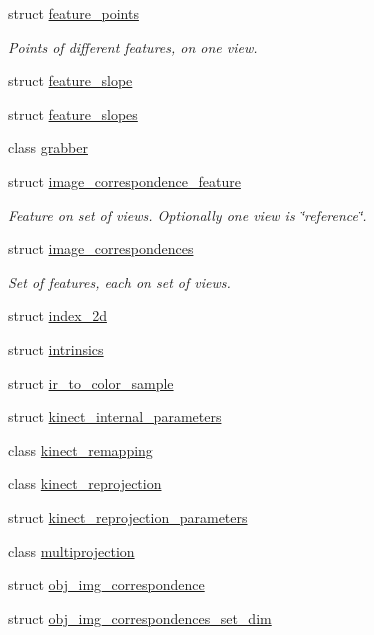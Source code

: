 \begin{DoxyCompactItemize}
struct \hyperlink{structtlz_1_1feature__points}{feature\+\_\+points}
\begin{DoxyCompactList}\small\item\em Points of different features, on one view. \end{DoxyCompactList}\item 
struct \hyperlink{structtlz_1_1feature__slope}{feature\+\_\+slope}
\item 
struct \hyperlink{structtlz_1_1feature__slopes}{feature\+\_\+slopes}
\item 
class \hyperlink{classtlz_1_1grabber}{grabber}
\item 
struct \hyperlink{structtlz_1_1image__correspondence__feature}{image\+\_\+correspondence\+\_\+feature}
\begin{DoxyCompactList}\small\item\em Feature on set of views. Optionally one view is \char`\"{}reference\char`\"{}. \end{DoxyCompactList}\item 
struct \hyperlink{structtlz_1_1image__correspondences}{image\+\_\+correspondences}
\begin{DoxyCompactList}\small\item\em Set of features, each on set of views. \end{DoxyCompactList}\item 
struct \hyperlink{structtlz_1_1index__2d}{index\+\_\+2d}
\item 
struct \hyperlink{structtlz_1_1intrinsics}{intrinsics}
\item 
struct \hyperlink{structtlz_1_1ir__to__color__sample}{ir\+\_\+to\+\_\+color\+\_\+sample}
\item 
struct \hyperlink{structtlz_1_1kinect__internal__parameters}{kinect\+\_\+internal\+\_\+parameters}
\item 
class \hyperlink{classtlz_1_1kinect__remapping}{kinect\+\_\+remapping}
\item 
class \hyperlink{classtlz_1_1kinect__reprojection}{kinect\+\_\+reprojection}
\item 
struct \hyperlink{structtlz_1_1kinect__reprojection__parameters}{kinect\+\_\+reprojection\+\_\+parameters}
\item 
class \hyperlink{classtlz_1_1multiprojection}{multiprojection}
\item 
struct \hyperlink{structtlz_1_1obj__img__correspondence}{obj\+\_\+img\+\_\+correspondence}
\item 
struct \hyperlink{structtlz_1_1obj__img__correspondences__set__dim}{obj\+\_\+img\+\_\+correspondences\+\_\+set\+\_\+dim}

\end{DoxyCompactItemize}
